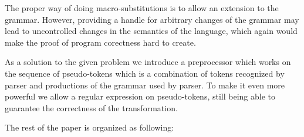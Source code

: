 The proper way of doing macro-substitutions is to allow an
extension to the grammar.  However, providing a handle for
arbitrary changes of the grammar may lead to uncontrolled 
changes in the semantics of the language, which again would
make the proof of program corectness hard to create.

As a solution to the given problem we introduce a preprocessor
which works on the sequence of pseudo-tokens which is a combination
of tokens recognized by parser and productions of the grammar
used by parser.  To make it even more powerful we allow a 
regular expression on pseudo-tokens, still being able to 
guarantee the correctness of the transformation.

The rest of the paper is organized as following:



